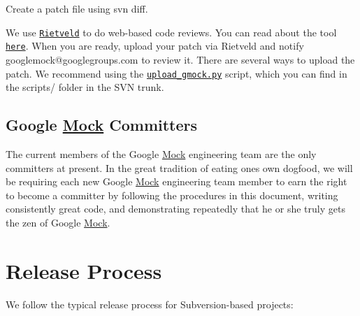 \begin{DoxyEnumerate}
\item Create a patch file using {\ttfamily svn diff}.
\end{DoxyEnumerate}
\begin{DoxyEnumerate}
\item We use \href{http://codereview.appspot.com/}{\tt Rietveld} to do web-\/based code reviews. You can read about the tool \href{https://github.com/rietveld-codereview/rietveld/wiki}{\tt here}. When you are ready, upload your patch via Rietveld and notify {\ttfamily googlemock@googlegroups.\+com} to review it. There are several ways to upload the patch. We recommend using the \href{../scripts/upload_gmock.py}{\tt upload\+\_\+gmock.\+py} script, which you can find in the {\ttfamily scripts/} folder in the S\+VN trunk.
\end{DoxyEnumerate}

\subsection*{Google \hyperlink{classMock}{Mock} Committers}

The current members of the Google \hyperlink{classMock}{Mock} engineering team are the only committers at present. In the great tradition of eating one\textquotesingle{}s own dogfood, we will be requiring each new Google \hyperlink{classMock}{Mock} engineering team member to earn the right to become a committer by following the procedures in this document, writing consistently great code, and demonstrating repeatedly that he or she truly gets the zen of Google \hyperlink{classMock}{Mock}.

\section*{Release Process}

We follow the typical release process for Subversion-\/based projects\+:


